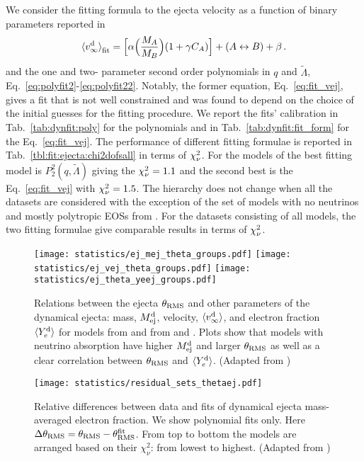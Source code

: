 We consider the fitting formula to the ejecta velocity as a function of binary parameters 
reported in \citet{Dietrich:2016hky,Radice:2018pdn}
%
\begin{equation}
{\langle v^{\text{d}}_\infty\rangle}_{\rm fit} = \Big[\alpha\Big(\frac{M_A}{M_B}\Big)(1+\gamma C_A)\Big] + (A\leftrightarrow B) + \beta
\label{eq:fit_vej} \, .
\end{equation}
%
and the one and two- parameter second order polynomials in $q$ and $\tilde{\Lambda}$, 
Eq.~\eqref{eq:polyfit2}-\eqref{eq:polyfit22}. Notably, the former equation, 
Eq.~\eqref{eq:fit_vej}, gives a fit that is not well constrained and was found to 
depend on the choice of the initial guesses for the fitting procedure.
%
We report the fits' calibration in Tab.~\ref{tab:dynfit:poly} for the polynomials and 
in Tab.~\ref{tab:dynfit:fit_form} for the Eq.~\eqref{eq:fit_vej}.
The performance of different fitting formulae is reported in 
Tab.~\ref{tbl:fit:ejecta:chi2dofsall} in terms of $\chi_{\nu}^2$.
%
For the models of \DSrefset{} the best fitting model is $P_2^2(q,\tilde\Lambda)$ giving the 
$\chi_{\nu}^2=1.1$ and the second best is the Eq.~\eqref{eq:fit_vej} with $\chi_{\nu}^2=1.5$.
The hierarchy does not change when all the datasets are considered with 
the exception of the set of models with no neutrinos and mostly polytropic 
\acp{EOS} from \citet{Bauswein:2013yna}. For the datasets consisting of all models, 
the two fitting formulae give comparable results in terms of $\chi_{\nu}^2$.

\begin{figure*}[t]
    \centering 
    \texttt{[image: statistics/ej\_mej\_theta\_groups.pdf]}
    \texttt{[image: statistics/ej\_vej\_theta\_groups.pdf]}
    \texttt{[image: statistics/ej\_theta\_yeej\_groups.pdf]}
    \caption{
        Relations between the ejecta $\theta_{\rm RMS}$ and other parameters of the dynamical
        ejecta: mass, $M^{\text{d}}_{\text{ej}}$, velocity, $\langle v^{\text{d}}_\infty\rangle$, and electron fraction $\langle Y^{\text{d}}_{e}\rangle$ for models from
        \DSrefset{} and \cite{Radice:2018pdn} from \DScool{} and \DSheatcool{}.
        Plots show that models with neutrino absorption have
        higher $M^{\text{d}}_{\text{ej}}$ and larger $\theta_{\rm RMS}$ as well as 
        a clear correlation between $\theta_{\rm RMS}$ and $\langle Y^{\text{d}}_{e}\rangle$.
        (Adapted from \citet{Nedora:2020qtd})
    }
    \label{fig:ejecta:dynej_thetarms}
\end{figure*}

\begin{figure}[t]
    \centering 
    \texttt{[image: statistics/residual\_sets\_thetaej.pdf]}
    \caption{
        Relative differences between data and fits of dynamical
        ejecta mass-averaged electron fraction.
        We show polynomial fits only.
        Here $\Delta \theta_{\rm RMS} = \theta_{\rm RMS} - \theta^{\rm fit}_{\rm RMS}$.
        From top to bottom the models are arranged based on their $\chi_{\nu}^2$: from lowest to highest.
        (Adapted from \citet{Nedora:2020qtd})
    }
    \label{fig:ejecta:dyn:theta}
\end{figure}

